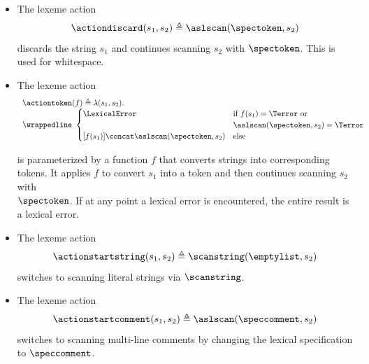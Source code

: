 \hypertarget{def-actiondiscard}{}
\begin{itemize}
\item
The lexeme action
\[
\actiondiscard(s_1, s_2) \triangleq \aslscan(\spectoken, s_2)
\]
discards the string $s_1$ and continues scanning $s_2$ with $\spectoken$.
This is used for whitespace.

\item
\hypertarget{def-actiontoken}{}
The lexeme action
\[
\begin{array}{l}
\actiontoken(f) \triangleq \lambda (s_1,s_2). \\
\wrappedline\
\begin{cases}
  \LexicalError & \text{if }f(s_1) = \Terror \text{ or}\\
   & \aslscan(\spectoken, s_2) = \Terror\\
  [f(s_1)] \concat \aslscan(\spectoken, s_2) & \text{else}
\end{cases}
\end{array}
\]

is parameterized by a function $f$ that converts strings into corresponding tokens.
It applies $f$ to convert $s_1$ into a token and then continues scanning $s_2$ with \\
$\spectoken$.
If at any point a lexical error is encountered, the entire result is a lexical error.

\item
\hypertarget{def-actionstartstring}{}
The lexeme action
\[
\actionstartstring(s_1, s_2) \triangleq \scanstring(\emptylist, s_2)
\]
switches to scanning literal strings via $\scanstring$.

\item The lexeme action
\hypertarget{def-actionstartcomment}{}
\[
\actionstartcomment(s_1, s_2) \triangleq \aslscan(\speccomment, s_2)
\]
switches to scanning multi-line comments by changing the lexical specification
to $\speccomment$.


\end{itemize}
